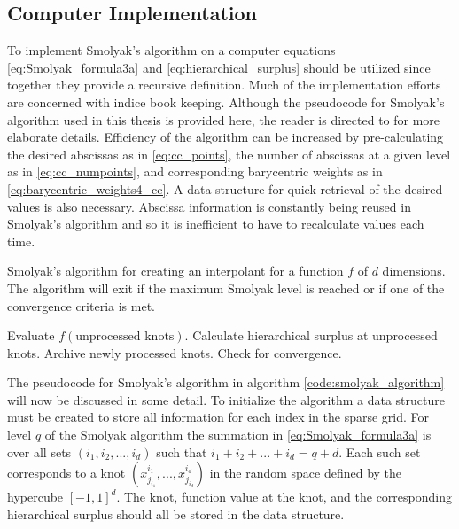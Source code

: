 \subsection{Computer Implementation} \label{subsec:smolyak_implementation}

To implement Smolyak's algorithm on a computer equations \ref{eq:Smolyak_formula3a} and \ref{eq:hierarchical_surplus} should be utilized since together they provide a recursive definition. Much of the implementation efforts are concerned with indice book keeping. Although the pseudocode for Smolyak's algorithm used in this thesis is provided here, the reader is directed to \cite{Klimke_Wohlmuth} for more elaborate details. Efficiency of the algorithm can be increased by pre-calculating the desired abscissas as in \ref{eq:cc_points}, the number of abscissas at a given level as in \ref{eq:cc_numpoints}, and corresponding barycentric weights as in \ref{eq:barycentric_weights4_cc}. A data structure for quick retrieval of the desired values is also necessary. Abscissa information is constantly being reused in Smolyak's algorithm and so it is inefficient to have to recalculate values each time.   
\begin{algorithm}
\caption{\label{code:smolyak_algorithm} Smolyak's algorithm for creating an interpolant for a function $f$ of $d$ dimensions. The algorithm will exit if the maximum Smolyak level is reached or if one of the convergence criteria is met.}  
\begin{algorithmic}[1]
      \EndFor
      \State Evaluate $f(\text{unprocessed knots})$.
      \State Calculate hierarchical surplus at unprocessed knots. 
      \State Archive newly processed knots.
   \EndFor
   \State Check for convergence.
\EndFor 
\end{algorithmic}
\end{algorithm}

The pseudocode for Smolyak's algorithm in algorithm \ref{code:smolyak_algorithm} will now be discussed in some detail. To initialize the algorithm a data structure must be created to store all information for each index in the sparse grid. For level $q$ of the Smolyak algorithm the summation in \ref{eq:Smolyak_formula3a} is over all sets $(i_1,i_2,...,i_d)$ such that $i_1 + i_2 + ... + i_d = q+d$. Each such set corresponds to a knot $(x^{i_1}_{j_{i_1}}, ..., x^{i_d}_{j_{i_d}})$ in the random space defined by the hypercube $\left[-1,1\right]^d$. The knot, function value at the knot, and the corresponding hierarchical surplus should all be stored in the data structure. 


